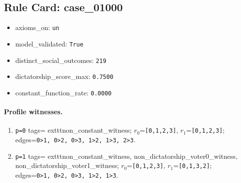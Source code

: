 \subsection*{Rule Card: case\_01000}
\begin{itemize}
\item axioms\_on: \texttt{un}
\item model\_validated: \texttt{True}
\item distinct\_social\_outcomes: \texttt{219}
\item dictatorship\_score\_max: \texttt{0.7500}
\item constant\_function\_rate: \texttt{0.0000}
\end{itemize}
\paragraph{Profile witnesses.}
\begin{enumerate}
\item \texttt{p=0} tags=	exttt{non\_constant\_witness}; $r_0$=\texttt{[0,1,2,3]}, $r_1$=\texttt{[0,1,2,3]}; edges=\texttt{0>1, 0>2, 0>3, 1>2, 1>3, 2>3}.
\item \texttt{p=1} tags=	exttt{non\_constant\_witness, non\_dictatorship\_voter0\_witness, non\_dictatorship\_voter1\_witness}; $r_0$=\texttt{[0,1,2,3]}, $r_1$=\texttt{[0,1,3,2]}; edges=\texttt{0>1, 0>2, 0>3, 1>2, 1>3}.
\end{enumerate}
